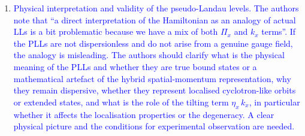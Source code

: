 \documentclass[aps,prb,onecolumn,nofootinbib,citeautoscript,10pt]{revtex4-2}
\begin{document}
\begin{enumerate}
\item \textcolor{blue}{Physical interpretation and validity of the pseudo-Landau levels. The authors note that ``a direct interpretation of the Hamiltonian as an analogy of actual LLs is a bit problematic because we have a mix of both $\Pi_x$ and $k_x$ terms''. If the PLLs are not dispersionless and do not arise from a genuine gauge field, the analogy is misleading. The authors should clarify what is the physical meaning of the PLLs and whether they are true bound states or a mathematical artefact of the hybrid spatial-momentum representation, why they remain dispersive, whether they represent localised cyclotron-like orbits or extended states, and what is the role of the tilting term $\eta_x\,k_x$, in particular whether it affects the localisation properties or the degeneracy. A clear physical picture and the conditions for experimental observation are needed.}


\end{enumerate}
\end{document}
